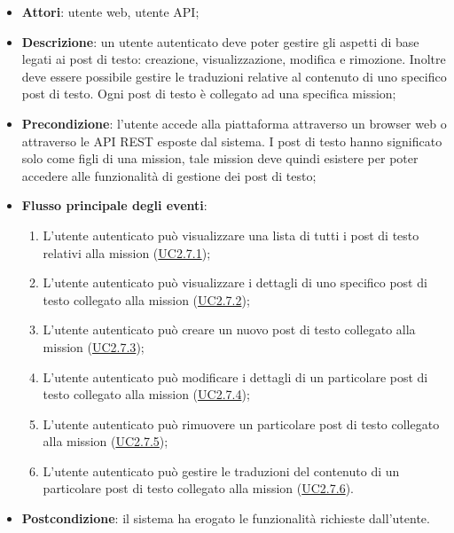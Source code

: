 \begin{itemize}
\item \textbf{Attori}: utente web, utente API;
\item \textbf{Descrizione}: un utente autenticato deve poter gestire gli aspetti di base legati ai post di testo: creazione, visualizzazione, modifica e rimozione. Inoltre deve essere possibile gestire le traduzioni relative al contenuto di uno specifico post di testo. Ogni post di testo è collegato ad una specifica mission; 
      \item \textbf{Precondizione}: l'utente accede alla piattaforma attraverso un browser web o attraverso le API REST esposte dal sistema. I post di testo hanno significato solo come figli di una mission, tale mission deve quindi esistere per poter accedere alle funzionalità di gestione dei post di testo;

        \item \textbf{Flusso principale degli eventi}:
          \begin{enumerate}
          \item L'utente autenticato può visualizzare una lista di tutti i post di testo relativi alla mission (\hyperlink{UC2.7.1}{UC2.7.1});
          \item L'utente autenticato può visualizzare i dettagli di uno specifico post di testo collegato alla mission (\hyperlink{UC2.7.2}{UC2.7.2});
          \item L'utente autenticato può creare un nuovo post di testo collegato alla mission (\hyperlink{UC2.7.3}{UC2.7.3});
          \item L'utente autenticato può modificare i dettagli di un particolare post di testo collegato alla mission (\hyperlink{UC2.7.4}{UC2.7.4});
          \item L'utente autenticato può rimuovere un particolare post di testo collegato alla mission (\hyperlink{UC2.7.5}{UC2.7.5});
          \item L'utente autenticato può gestire le traduzioni del contenuto di un particolare post di testo collegato alla mission (\hyperlink{UC2.7.6}{UC2.7.6}).

      \end{enumerate}
    \item \textbf{Postcondizione}: il sistema ha erogato le funzionalità richieste dall'utente.
  \end{itemize}
\hypertarget{UC2.7.1}{}
